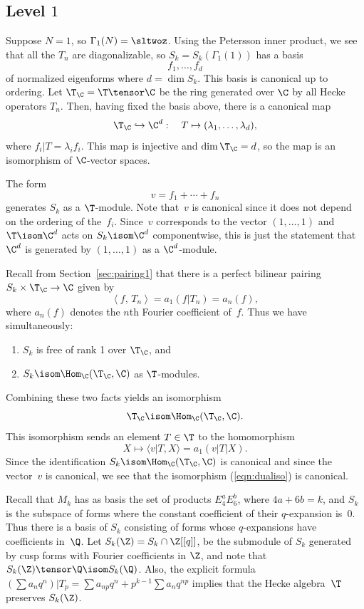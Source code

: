 \documentclass{report}
\begin{document}
\subsection{Level $1$}
Suppose $N=1$, so $\Gamma_1(N)=\sltwoz$. Using the Petersson
inner product, we see that all the $T_n$ are diagonalizable, so
$S_k=S_k(\Gamma_1(1))$ has a basis
$$
   f_1,\ldots,f_d
$$
of normalized eigenforms where $d=\dim S_k$.  This basis is canonical
up to ordering.
Let $\T_{\C}=\T\tensor\C$ be the ring generated over $\C$ by
all Hecke operators $T_n$.
Then, having fixed the basis above, there is a canonical map
\[
  \T_{\C}\hookrightarrow{}\C^d: \quad T\mapsto(\lambda_1,\ldots,\lambda_d),
\]
where $f_i|T=\lambda_{i}f_i$.
This map is injective and $\dim\T_{\C}=d$, so the map is an
isomorphism of $\C$-vector spaces.

The form
\[
  v=f_1+\cdots+f_n
\]
generates $S_k$ as a $\T$-module.  Note that~$v$ is canonical since
it does not depend on the ordering of the~$f_i$.
Since~$v$ corresponds to the vector $(1,\ldots,1)$ and
$\T\isom\C^d$ acts on $S_k\isom\C^d$ componentwise, this
is just the statement that $\C^d$ is generated by
$(1,\ldots,1)$ as a $\C^d$-module.

Recall from Section~\ref{sec:pairing1}
that there is a perfect bilinear pairing $S_k\times \T_\C \to \C$
given by
\[
 \left\langle f,\, T_n\right\rangle = a_1(f|T_n)=a_n(f),
\]
where $a_n(f)$ denotes the $n$th Fourier coefficient of~$f$.
Thus we have simultaneously:
\begin{enumerate}
\item $S_k$ is free of rank 1 over $\T_\C$, and%
\item $S_k\isom \Hom_{\C}(\T_\C,\C)$ as $\T$-modules.
\end{enumerate}
Combining these two facts yields an isomorphism
\begin{equation}\label{eqn:dualiso}
  \T_\C \isom\Hom_{\C}(\T_\C,\C).
\end{equation}
This isomorphism sends
an element $T \in \T$ to the homomorphism
$$X \mapsto \langle v|T, X \rangle = a_1(v|T|X).$$
Since the identification $S_k\isom \Hom_{\C}(\T_\C,\C)$ is canonical
and since the vector~$v$ is canonical, we see that the isomorphism (\ref{eqn:dualiso})
is canonical.


Recall that $M_k$ has as basis the set of products $E_4^a E_6^b$,
where $4a+6b=k$, and $S_k$ is the subspace of forms where the
constant coefficient of their $q$-expansion is~$0$.  Thus there is
a basis of $S_k$ consisting of forms whose $q$-expansions have
coefficients in~$\Q$.  Let $S_k(\Z) = S_k \cap \Z[[q]]$, be the
submodule of $S_k$ generated by cusp forms with Fourier
coefficients in $\Z$, and note that $S_k(\Z)\tensor\Q \isom
S_k(\Q)$.  Also, the explicit formula $(\sum a_n q^n)|T_p = \sum
a_{np}q^n + p^{k-1} \sum a_n q^{np}$ implies that the Hecke
algebra~$\T$ preserves $S_k(\Z)$.
\end{document}
